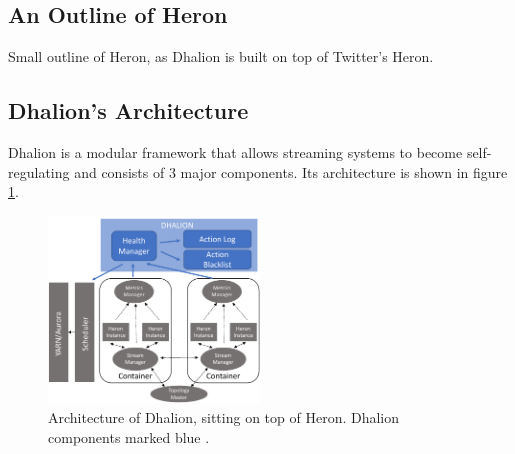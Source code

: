         \subsection{An Outline of Heron}
        \label{sub:heron-outline}
        Small outline of Heron, as Dhalion is built on top of Twitter's Heron. \cite{heron}

        \subsection{Dhalion's Architecture}
        
        \label{sub:dhalion-architecture}
        Dhalion is a modular framework that allows streaming systems to become self-regulating and consists of 3 major components.
        Its architecture is shown in figure \ref{fig:dhalion}.

        \begin{figure}[hbt]
            \centering
            \includegraphics[width=0.5\textwidth]{Bilder/dhalion.png}
            \caption{
                Architecture of Dhalion, sitting on top of Heron. Dhalion components marked blue \cite{dhalion}.
            }
            \label{fig:dhalion}
        \end{figure}

